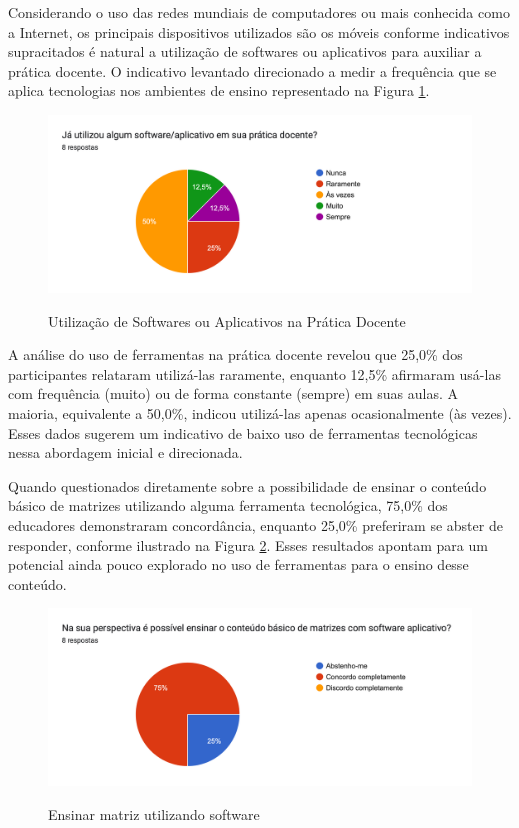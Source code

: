 Considerando o uso das redes mundiais de computadores ou mais conhecida como a Internet, os principais dispositivos utilizados são os  móveis conforme indicativos supracitados é natural a utilização de softwares ou aplicativos para auxiliar a prática docente. O indicativo levantado direcionado a medir a frequência que se aplica tecnologias nos ambientes de ensino representado na Figura \ref{fig:softs_docencia}.

\begin{figure}[h!]
    \caption{Utilização de Softwares ou Aplicativos na Prática Docente}
    \centering
    \includegraphics[scale=0.2]{figuras/resultados/software_pratica_docente.png}
    \label{fig:softs_docencia}
\end{figure}



A análise do uso de ferramentas na prática docente revelou que 25,0\% dos participantes relataram utilizá-las raramente, enquanto 12,5\% afirmaram usá-las com frequência (muito) ou de forma constante (sempre) em suas aulas. A maioria, equivalente a 50,0\%, indicou utilizá-las apenas ocasionalmente (às vezes). Esses dados sugerem um indicativo de baixo uso de ferramentas tecnológicas nessa abordagem inicial e direcionada.

Quando questionados diretamente sobre a possibilidade de ensinar o conteúdo básico de matrizes utilizando alguma ferramenta tecnológica, 75,0\% dos educadores demonstraram concordância, enquanto 25,0\% preferiram se abster de responder, conforme ilustrado na Figura \ref{fig:ensino_matriz_app}. Esses resultados apontam para um potencial ainda pouco explorado no uso de ferramentas para o ensino desse conteúdo.

\begin{figure}[h!]
    \caption{Ensinar matriz utilizando software}
    \centering
    \includegraphics[scale=0.2]{figuras/resultados/ensino_matriz_app.png}
    \label{fig:ensino_matriz_app}
\end{figure}


